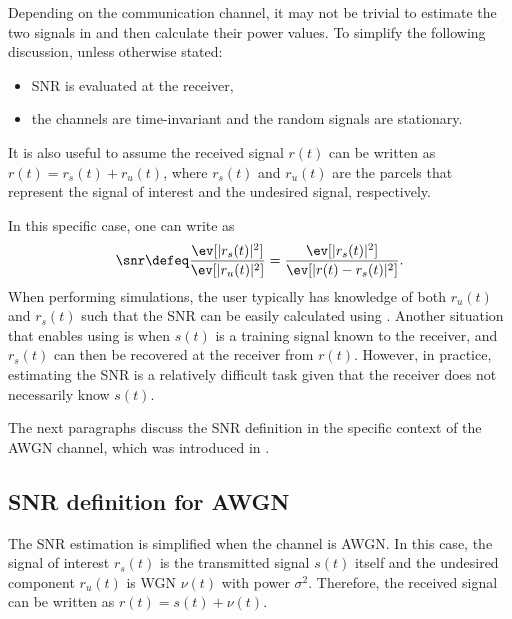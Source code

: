 Depending on the communication channel, it may not be trivial to estimate the two signals in  and then calculate their power values.
To simplify the following discussion, unless otherwise stated:
\begin{itemize}
	\item SNR is evaluated at the receiver,
	\item the channels are time-invariant and the random signals are stationary.
\end{itemize}


It is also useful to assume the received signal $r(t)$ can be written as 
$r(t) = r_s(t)+r_u(t)$, where $r_s(t)$ and $r_u(t)$ are the parcels that
represent the signal of interest and the undesired signal, respectively.

In this specific case, one can write  as
\begin{equation}
\snr \defeq \frac{\ev[|r_s(t)|^2]}{\ev[|r_u(t)|^2]} = \frac{\ev[|r_s(t)|^2]}{\ev[|r(t)-r_s(t)|^2]}.
\label{eq:snr_simple2}
\end{equation}
When performing simulations, the user typically has knowledge of both $r_u(t)$ and $r_s(t)$ such that the SNR can be easily calculated using . Another situation that enables using  is when $s(t)$ is a training signal known to the receiver, and $r_s(t)$ can then be recovered at the receiver from $r(t)$.
However, in practice, estimating the SNR is a relatively difficult task given that the  receiver does not necessarily know $s(t)$.%

The next paragraphs discuss the SNR definition in the specific context of the AWGN channel, which
was introduced in .

\subsection{SNR definition for AWGN}
The SNR estimation is simplified when the channel is AWGN. 
In this case, the signal of interest $r_s(t)$ is the transmitted signal $s(t)$ itself and the undesired component $r_u(t)$ is WGN $\nu(t)$ with power $\sigma^2$. Therefore, the received signal can be written as $r(t)=s(t)+\nu(t)$.


